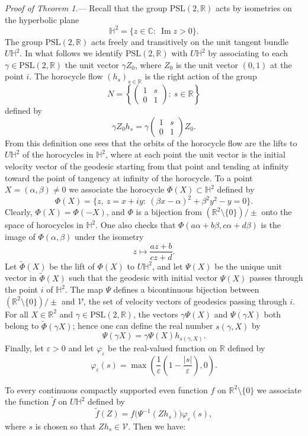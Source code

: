 \documentclass[11pt]{article}
\theoremstyle{remark}
\newcommand{\R}{\mathbb{R}}
\newcommand{\C}{\mathbb{C}}
\newcommand{\PSL}{\mathrm{PSL}}
\newcommand{\Impart}{\operatorname{Im}}
\begin{document}
\noindent\emph{Proof of Theorem 1.}---
Recall that the group $\PSL(2,\R)$ acts by isometries on the hyperbolic plane
\[
\mathbb H^2=\{z\in\C:\ \Impart z>0\}.
\]
The group $\PSL(2,\R)$ acts freely and transitively on the unit tangent bundle $U\mathbb H^2$. In what follows we identify $\PSL(2,\R)$ with $U\mathbb H^2$ by associating to each $\gamma\in\PSL(2,\R)$ the unit vector $\gamma Z_0$, where $Z_0$ is the unit vector $(0,1)$ at the point $i$. The horocycle flow $(h_s)_{s\in\R}$ is the right action of the group
\[
N=\left\{\begin{pmatrix}1&s\\0&1\end{pmatrix}:\ s\in\R\right\}
\]
defined by
\[
\gamma Z_0h_s=\gamma\begin{pmatrix}1&s\\0&1\end{pmatrix}Z_0.
\]
From this definition one sees that the orbits of the horocycle flow are the lifts to $U\mathbb H^2$ of the horocycles in $\mathbb H^2$, where at each point the unit vector is the initial velocity vector of the geodesic starting from that point and tending at infinity toward the point of tangency at infinity of the horocycle. To a point $X=(\alpha,\beta)\ne0$ we associate the horocycle $\Phi(X)\subset\mathbb H^2$ defined by
\[
\Phi(X)=\{z,\ z=x+iy:\ (\beta x-\alpha)^2+\beta^2y^2-y=0\}.
\]
Clearly, $\Phi(X)=\Phi(-X)$, and $\Phi$ is a bijection from $(\R^2\setminus\{0\})/\pm$ onto the space of horocycles in $\mathbb H^2$. One also checks that $\Phi(a\alpha+b\beta,c\alpha+d\beta)$ is the image of $\Phi(\alpha,\beta)$ under the isometry
\[
z\longmapsto \frac{az+b}{cz+d}.
\]
Let $\widetilde\Phi(X)$ be the lift of $\Phi(X)$ to $U\mathbb H^2$, and let $\Psi(X)$ be the unique unit vector in $\widetilde\Phi(X)$ such that the geodesic with initial vector $\Psi(X)$ passes through the point $i$ of $\mathbb H^2$. The map $\Psi$ defines a bicontinuous bijection between $(\R^2\setminus\{0\})/\pm$ and $\mathcal V$, the set of velocity vectors of geodesics passing through $i$. For all $X\in\R^2$ and $\gamma\in\PSL(2,\R)$, the vectors $\gamma\Psi(X)$ and $\Psi(\gamma X)$ both belong to $\widetilde\Phi(\gamma X)$; hence one can define the real number $s(\gamma,X)$ by
\[
\Psi(\gamma X)=\gamma\Psi(X)h_{s(\gamma,X)}.
\]
Finally, let $\varepsilon>0$ and let $\varphi_\varepsilon$ be the real-valued function on $\R$ defined by
\[
\varphi_\varepsilon(s)=\max\left(\frac{1}{\varepsilon}\left(1-\frac{|s|}{\varepsilon}\right),0\right).
\]

To every continuous compactly supported even function $f$ on $\R^2\setminus\{0\}$ we associate the function $\widetilde f$ on $U\mathbb H^2$ defined by
\[
\widetilde f(Z)=f\bigl(\Psi^{-1}(Zh_s)\bigr)\varphi_\varepsilon(s),
\]
where $s$ is chosen so that $Zh_s\in\mathcal V$. Then we have:
\end{document}
